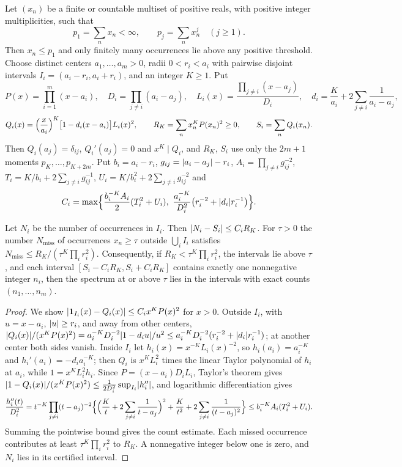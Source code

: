 Let $(x_n)$ be a finite or countable multiset of positive reals, with positive integer
multiplicities, such that
\begin{equation}\label{li:eq:summ}
 p_1=\sum_nx_n<\infty,\qquad p_j=\sum_nx_n^j\quad(j\ge1).
\end{equation}
Then $x_n\le p_1$ and only finitely many occurrences lie above any positive threshold. Choose
distinct centers $a_1,\dots,a_m>0$, radii $0<r_i<a_i$ with pairwise disjoint intervals
$I_i=(a_i-r_i,a_i+r_i)$, and an integer $K\ge1$. Put
\[
 P(x)=\prod_{i=1}^m(x-a_i),\quad D_i=\prod_{j\ne i}(a_i-a_j),\quad
 L_i(x)=\frac{\prod_{j\ne i}(x-a_j)}{D_i},\quad d_i=\frac K{a_i}+2\sum_{j\ne i}\frac1{a_i-a_j},
\]
\[
 Q_i(x)=\Bigl(\frac x{a_i}\Bigr)^K\bigl[1-d_i(x-a_i)\bigr]L_i(x)^2,\qquad
 R_K=\sum_nx_n^KP(x_n)^2\ge0,\qquad S_i=\sum_nQ_i(x_n).
\]
Then $Q_i(a_j)=\delta_{ij}$, $Q_i'(a_j)=0$ and $x^K\mid Q_i$, and $R_K$, $S_i$ use only the $2m+1$
moments $p_K,\dots,p_{K+2m}$. Put $b_i=a_i-r_i$, $g_{ij}=\lvert a_i-a_j\rvert-r_i$,
$A_i=\prod_{j\ne i}g_{ij}^{-2}$, $T_i=K/b_i+2\sum_{j\ne i}g_{ij}^{-1}$,
$U_i=K/b_i^2+2\sum_{j\ne i}g_{ij}^{-2}$ and
\[
 C_i=\max\Bigl\{\frac{b_i^{-K}A_i}2(T_i^2+U_i),\ \frac{a_i^{-K}}{D_i^2}\bigl(r_i^{-2}+\abs{d_i}r_i^{-1}\bigr)\Bigr\}.
\]

\begin{theorem}\label{li:thm:residual}
Let $N_i$ be the number of occurrences in $I_i$. Then $\lvert N_i-S_i\rvert\le C_iR_K$. For $\tau>0$ the
number $N_{\mathrm{miss}}$ of occurrences $x_n\ge\tau$ outside $\bigcup_iI_i$ satisfies
$N_{\mathrm{miss}}\le R_K/(\tau^K\prod_ir_i^2)$. Consequently, if $R_K<\tau^K\prod_ir_i^2$, the
intervals lie above $\tau$, and each interval $[S_i-C_iR_K,S_i+C_iR_K]$ contains exactly one
nonnegative integer $n_i$, then the spectrum at or above $\tau$ lies in the intervals with exact
counts $(n_1,\dots,n_m)$.
\end{theorem}

\begin{proof}
We show $\lvert\mathbf{1}_{I_i}(x)-Q_i(x)\rvert\le C_ix^KP(x)^2$ for $x>0$. Outside $I_i$, with $u=x-a_i$,
$\lvert u\rvert\ge r_i$, and away from other centers,
$\lvert Q_i(x)\rvert/(x^KP(x)^2)=a_i^{-K}D_i^{-2}\lvert1-d_iu\rvert/u^2\le a_i^{-K}D_i^{-2}(r_i^{-2}+\lvert d_i\rvert r_i^{-1})$;
at another center both sides vanish. Inside $I_i$ let $h_i(x)=x^{-K}L_i(x)^{-2}$, so
$h_i(a_i)=a_i^{-K}$ and $h_i'(a_i)=-d_ia_i^{-K}$; then $Q_i$ is $x^KL_i^2$ times the linear Taylor
polynomial of $h_i$ at $a_i$, while $1=x^KL_i^2h_i$. Since $P=(x-a_i)D_iL_i$, Taylor's theorem gives
$\lvert1-Q_i(x)\rvert/(x^KP(x)^2)\le\frac1{2D_i^2}\sup_{I_i}\lvert h_i''\rvert$, and logarithmic differentiation gives
\[
 \frac{h_i''(t)}{D_i^2}=t^{-K}\prod_{j\ne i}(t-a_j)^{-2}\Bigl\{\Bigl(\frac Kt+2\sum_{j\ne i}\frac1{t-a_j}\Bigr)^2
 +\frac K{t^2}+2\sum_{j\ne i}\frac1{(t-a_j)^2}\Bigr\}\le b_i^{-K}A_i(T_i^2+U_i).
\]
Summing the pointwise bound gives the count estimate. Each missed occurrence contributes at least
$\tau^K\prod_ir_i^2$ to $R_K$. A nonnegative integer below one is zero, and $N_i$ lies in its
certified interval.
\end{proof}

